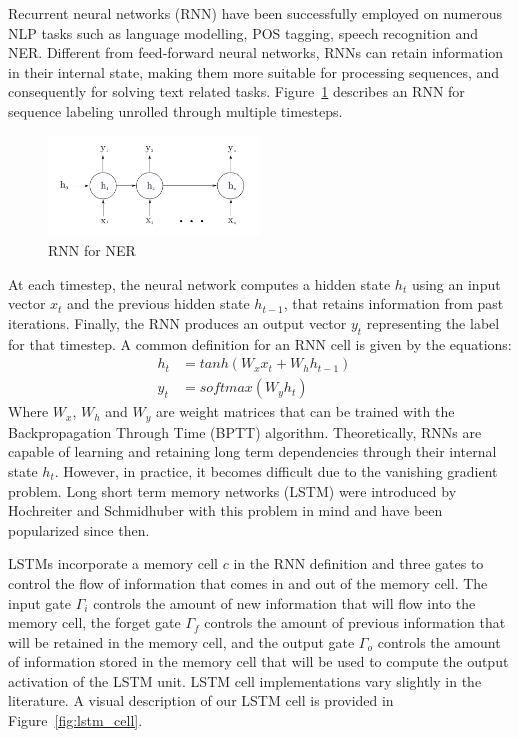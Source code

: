 \documentclass{nle}
\begin{document}
Recurrent neural networks (RNN) have been successfully employed on numerous NLP tasks such as
language modelling, POS tagging, speech recognition and NER. Different from feed-forward 
neural networks, RNNs can retain information in their internal state, making them more 
suitable for processing sequences, and consequently for solving text related tasks. 
Figure~\ref{fig:rnn_network} describes an RNN for sequence labeling unrolled through multiple 
timesteps. 
%
\begin{figure}[h]
  \centering
  \includegraphics[width=0.5\textwidth]{pics/rnn_network}
  \caption{RNN for NER}
  \label{fig:rnn_network}
\end{figure}
%
At each timestep, the neural network computes a hidden state $ h_t $ using an input 
vector $ x_t $ and the previous hidden state $ h_{t-1} $, that retains information from past 
iterations. Finally, the RNN produces an output vector $ y_t $ representing the label for that 
timestep. A common definition for an RNN cell is given by the equations:
%
\begin{align*}
h_t &= tanh(W_x x_t + W_h h_{t-1}) &\\
y_t &= softmax(W_y h_t) &
\end{align*}
%
Where $ W_x $, $ W_h $ and $ W_y $ are weight matrices that can be trained with the 
Backpropagation Through Time (BPTT) algorithm. Theoretically, RNNs are capable of learning
and retaining long term dependencies through their internal state $ h_t $. However, in practice,
it becomes difficult due to the vanishing gradient problem. Long short term memory networks (LSTM) were 
introduced by Hochreiter and Schmidhuber \cite{Hochreiter1997} with this problem in mind and 
have been popularized since then. 

LSTMs incorporate a memory cell $ c $ in the RNN definition and three gates to control 
the flow of information that comes in and out of the memory cell.
The input gate $ \Gamma_{i} $ controls the amount of new information that will flow into the memory cell,
the forget gate $ \Gamma_{f} $ controls the amount of previous information that will be retained in the memory
cell, and the output gate $ \Gamma_{o} $ controls the amount of information stored in the memory cell that
will be used to compute the output activation of the LSTM unit. 
LSTM cell implementations vary slightly in the literature. A visual description of 
our LSTM cell is provided in Figure~\ref{fig:lstm_cell}.
\end{document}
